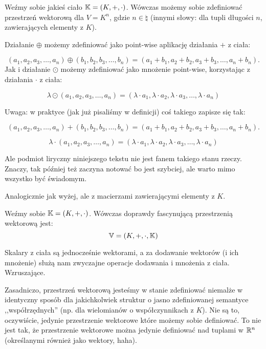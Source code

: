 \begin{example}
    Weźmy sobie jakieś ciało \(\mathbb{K} = (K, +, \cdot)\). Wówczas możemy sobie zdefiniować przestrzeń wektorową dla \(V = K^n\), gdzie \(n \in \natural\) (innymi słowy: dla tupli długości \(n\), zawierających elementy z \(K\)).
    
    Działanie \(\oplus\) możemy zdefiniować jako point-wise aplikację działania \(+\) z ciała: 
    
    \[ 
        (a_1, a_2, a_3, \dots, a_n) \oplus (b_1, b_2, b_3, \dots, b_n) = (a_1 + b_1, a_2 + b_2, a_3 + b_3, \dots, a_n + b_n).
    \]
    Jak i działanie \(\odot\) możemy zdefiniować jako mnożenie point-wise, korzystając z działania \( \cdot \) z ciała:
    
    \[ 
        \lambda \odot (a_1, a_2, a_3, \dots, a_n) = (\lambda \cdot a_1, \lambda \cdot a_2, \lambda \cdot a_3, \dots, \lambda \cdot a_n)
    \]
    
    Uwaga: w praktyce (jak już pisaliśmy w definicji) coś takiego zapisze się tak: 
    
    \[ 
        (a_1, a_2, a_3, \dots, a_n) + (b_1, b_2, b_3, \dots, b_n) = (a_1 + b_1, a_2 + b_2, a_3 + b_3, \dots, a_n + b_n).
    \]
    
    \[ 
        \lambda \cdot (a_1, a_2, a_3, \dots, a_n) = (\lambda \cdot a_1, \lambda \cdot a_2, \lambda \cdot a_3, \dots, \lambda \cdot a_n)
    \]
    
    Ale podmiot liryczny niniejszego tekstu nie jest fanem takiego stanu rzeczy. Znaczy, tak później też zaczyna notować bo jest szybciej, ale warto mimo wszystko być świadomym.
\end{example}

\begin{example}
    Analogicznie jak wyżej, ale z macierzami zawierającymi elementy z \(K\).
\end{example}

\begin{example}
\label{fascinating}
    Weźmy sobie \(\mathbb{K} = (K, +, \cdot)\). Wówczas doprawdy fascynującą przestrzenią wektorową jest:
    \[ 
        \mathbb{V} = (K, +, \cdot, \mathbb{K})
    \]
    
    Skalary z ciała są jednocześnie wektorami, a za dodawanie wektorów (i ich mnożenie) służą nam zwyczajne operacje dodawania i mnożenia z ciała. Wzruszające.
\end{example}

Zasadniczo, przestrzeń wektorową jesteśmy w stanie zdefiniować niemalże w identyczny sposób dla jakichkolwiek struktur o jasno zdefiniowanej semantyce ,,współrzędnych'' (np. dla wielomianów o współczynnikach z \(K\)). Nie są to, oczywiście, jedynie przestrzenie wektorowe które możemy sobie definiować. To nie jest tak, że przestrzenie wektorowe można jedynie definiować nad tuplami w \(\mathbb{R}^{n}\) (określanymi również jako wektory, haha).

